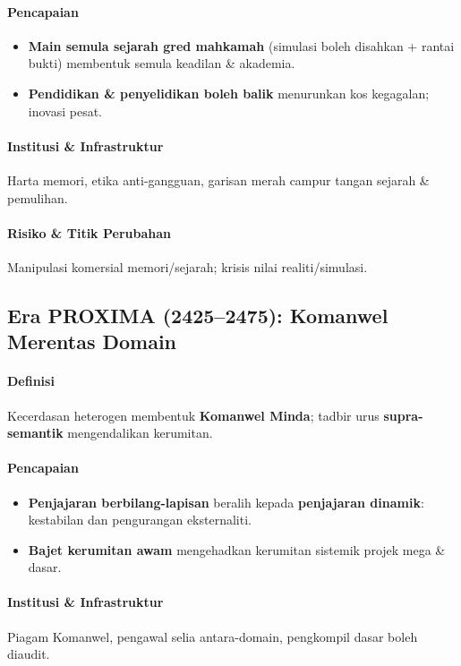 \documentclass[11pt]{article}
\begin{document}
\paragraph{Pencapaian}
\begin{itemize}[noitemsep]
  \item \textbf{Main semula sejarah gred mahkamah} (simulasi boleh disahkan + rantai bukti) membentuk semula keadilan \& akademia.
  \item \textbf{Pendidikan \& penyelidikan boleh balik} menurunkan kos kegagalan; inovasi pesat.
\end{itemize}

\paragraph{Institusi \& Infrastruktur} Harta memori, etika anti-gangguan, garisan merah campur tangan sejarah \& pemulihan.

\paragraph{Risiko \& Titik Perubahan} Manipulasi komersial memori/sejarah; krisis nilai realiti/simulasi.

\subsection{Era PROXIMA (2425–2475): Komanwel Merentas Domain}
\paragraph{Definisi} Kecerdasan heterogen membentuk \textbf{Komanwel Minda}; tadbir urus \textbf{supra-semantik} mengendalikan kerumitan.

\paragraph{Pencapaian}
\begin{itemize}[noitemsep]
  \item \textbf{Penjajaran berbilang-lapisan} beralih kepada \textbf{penjajaran dinamik}: kestabilan dan pengurangan eksternaliti.
  \item \textbf{Bajet kerumitan awam} mengehadkan kerumitan sistemik projek mega \& dasar.
\end{itemize}

\paragraph{Institusi \& Infrastruktur} Piagam Komanwel, pengawal selia antara-domain, pengkompil dasar boleh diaudit.
\end{document}
